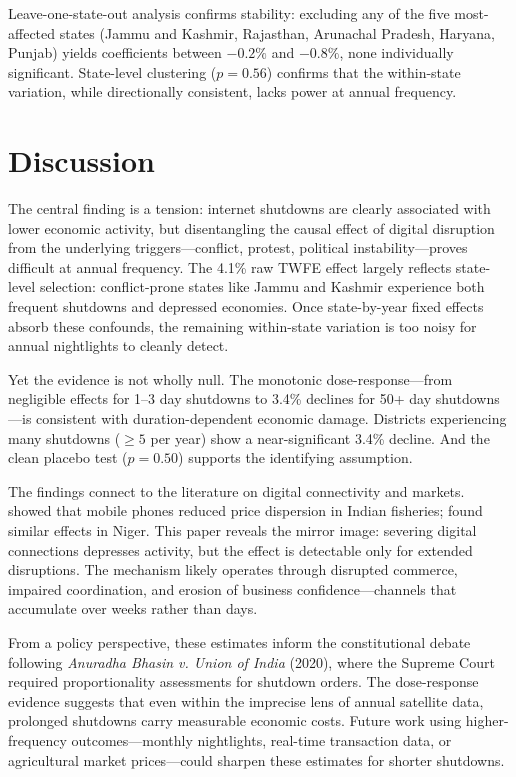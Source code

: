 \documentclass[12pt]{article}
\begin{document}
Leave-one-state-out analysis confirms stability: excluding any of the five most-affected states (Jammu and Kashmir, Rajasthan, Arunachal Pradesh, Haryana, Punjab) yields coefficients between $-0.2\%$ and $-0.8\%$, none individually significant. State-level clustering ($p = 0.56$) confirms that the within-state variation, while directionally consistent, lacks power at annual frequency.


\section{Discussion}

The central finding is a tension: internet shutdowns are clearly associated with lower economic activity, but disentangling the causal effect of digital disruption from the underlying triggers---conflict, protest, political instability---proves difficult at annual frequency. The 4.1\% raw TWFE effect largely reflects state-level selection: conflict-prone states like Jammu and Kashmir experience both frequent shutdowns and depressed economies. Once state-by-year fixed effects absorb these confounds, the remaining within-state variation is too noisy for annual nightlights to cleanly detect.

Yet the evidence is not wholly null. The monotonic dose-response---from negligible effects for 1--3 day shutdowns to 3.4\% declines for 50+ day shutdowns---is consistent with duration-dependent economic damage. Districts experiencing many shutdowns ($\geq 5$ per year) show a near-significant 3.4\% decline. And the clean placebo test ($p = 0.50$) supports the identifying assumption.

The findings connect to the literature on digital connectivity and markets. \citet{jensen2007digital} showed that mobile phones reduced price dispersion in Indian fisheries; \citet{aker2010information} found similar effects in Niger. This paper reveals the mirror image: severing digital connections depresses activity, but the effect is detectable only for extended disruptions. The mechanism likely operates through disrupted commerce, impaired coordination, and erosion of business confidence---channels that accumulate over weeks rather than days.

From a policy perspective, these estimates inform the constitutional debate following \textit{Anuradha Bhasin v. Union of India} (2020), where the Supreme Court required proportionality assessments for shutdown orders. The dose-response evidence suggests that even within the imprecise lens of annual satellite data, prolonged shutdowns carry measurable economic costs. Future work using higher-frequency outcomes---monthly nightlights, real-time transaction data, or agricultural market prices---could sharpen these estimates for shorter shutdowns.
\end{document}
